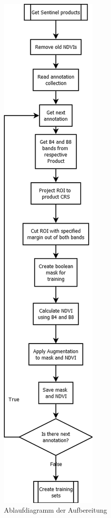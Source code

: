 \begin{figure}[H]
  \centering
  \includegraphics[height=0.75\textheight]{pics/create-ndvi.png}
  \caption{Ablaufdiagramm der Aufbereitung}
  \label{fig:create-ndvi}
\end{figure}

